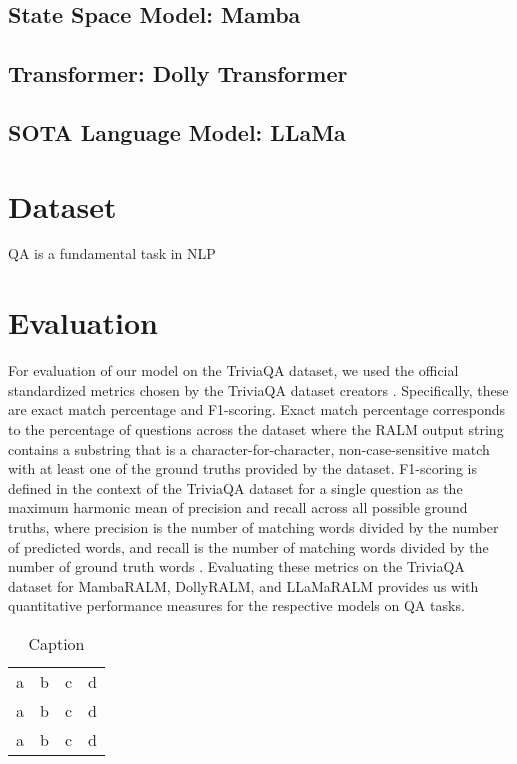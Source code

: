 \documentclass[11pt]{article}
\begin{document}
\subsection{State Space Model: Mamba}

\subsection{Transformer: Dolly Transformer}

\subsection{SOTA Language Model: LLaMa}

\section{Dataset}
QA is a fundamental task in NLP

\section{Evaluation}
For evaluation of our model on the TriviaQA dataset, we used the official standardized metrics chosen by the TriviaQA dataset creators \cite{trivia_qa_2017}. Specifically, these are exact match percentage and F1-scoring. Exact match percentage corresponds to the percentage of questions across the dataset where the RALM output string contains a substring that is a character-for-character, non-case-sensitive match with at least one of the ground truths provided by the dataset. F1-scoring is defined in the context of the TriviaQA dataset for a single question as the maximum harmonic mean of precision and recall across all possible ground truths, where precision is the number of matching words divided by the number of predicted words, and recall is the number of matching words divided by the number of ground truth words \cite{Beck_Reed_2020}. Evaluating these metrics on the TriviaQA dataset for MambaRALM, DollyRALM, and LLaMaRALM provides us with quantitative performance measures for the respective models on QA tasks.

\begin{table}
    \centering
    \begin{tabular}{cccc}
        a & b & c & d \\
        a & b & c & d\\
        a & b & c & d\\
    \end{tabular}
    \caption{Caption}
    \label{tab:my_label}
\end{table}
\end{document}
